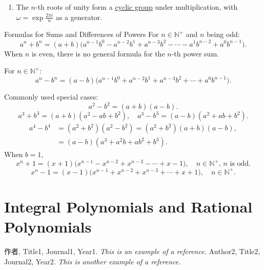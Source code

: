 \documentclass[11pt]{elegantbook}
\begin{document}
\begin{property}
    \begin{enumerate}
        \item The \( n \)-th roots of unity form a \underline{cyclic group} under multiplication, 
            with \( \omega = \exp{\frac{2\pi i}{n}} \) as a generator.
    \end{enumerate}
\end{property}

\begin{proposition}{Formulas for Sums and Differences of Powers}
    For \(n \in \mathbb{N^+}\) and \(n\) being odd:
    \[
    a^n + b^n = (a+b)\big(a^{n-1}b^0 - a^{n-2}b^1 + a^{n-3}b^2 - \cdots - a^1b^{n-2} + a^0b^{n-1}\big).
    \]
    When \(n\) is even, there is no general formula for the \(n\)-th power sum.

    For \(n \in \mathbb{N^+}\):
    \[
    a^n - b^n = (a-b)\big(a^{n-1}b^0 + a^{n-2}b^1 + a^{n-3}b^2 + \cdots + a^0b^{n-1}\big).
    \]

    Commonly used special cases:
    \[
    a^2 - b^2 = (a+b)(a-b).
    \]
    \[
    a^3 + b^3 = (a+b)(a^2 - ab + b^2), \quad a^3 - b^3 = (a-b)(a^2 + ab + b^2).
    \]
    \[
    \begin{aligned}
    a^4 - b^4 &= (a^2 + b^2)(a^2 - b^2) = (a^2 + b^2)(a+b)(a-b), \\
    &= (a-b)(a^3 + a^2b + ab^2 + b^3).
    \end{aligned}
    \]
    When \(b=1\),
    \[
    x^n + 1 = (x+1)\big(x^{n-1} - x^{n-2} + x^{n-3} - \cdots + x - 1\big), \quad n \in \mathbb{N^+}, \, n \text{ is odd}.
    \]
    \[
    x^n - 1 = (x-1)\big(x^{n-1} + x^{n-2} + x^{n-3} + \cdots + x + 1\big), \quad n \in \mathbb{N^+}.
    \]
\end{proposition}



\chapter{Integral Polynomials and Rational Polynomials}


\begin{thebibliography}{99} 
 作者, Title1, Journal1, Year1. \emph{ This is an example of a reference.}
 Author2, Title2, Journal2, Year2. \emph{ This is another example of a reference.}
\end{thebibliography}
\end{document}
